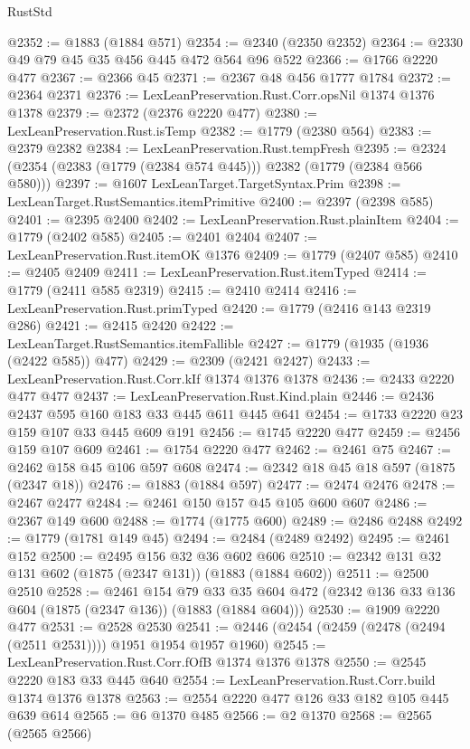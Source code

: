 \begin{lexlean}{RustStd}
\begin{coremodule}
@2352 := @1883 (@1884 @571)
@2354 := @2340 (@2350 @2352)
@2364 := @2330 @49 @79 @45 @35 @456 @445 @472 @564 @96 @522
@2366 := @1766 @2220 @477
@2367 := @2366 @45
@2371 := @2367 @48 @456 @1777 @1784
@2372 := @2364 @2371
@2376 := LexLeanPreservation.Rust.Corr.opsNil @1374 @1376 @1378
@2379 := @2372 (@2376 @2220 @477)
@2380 := LexLeanPreservation.Rust.isTemp
@2382 := @1779 (@2380 @564)
@2383 := @2379 @2382
@2384 := LexLeanPreservation.Rust.tempFresh
@2395 := @2324 (@2354 (@2383 (@1779 (@2384 @574 @445))) @2382 (@1779 (@2384 @566 @580)))
@2397 := @1607 LexLeanTarget.TargetSyntax.Prim
@2398 := LexLeanTarget.RustSemantics.itemPrimitive
@2400 := @2397 (@2398 @585)
@2401 := @2395 @2400
@2402 := LexLeanPreservation.Rust.plainItem
@2404 := @1779 (@2402 @585)
@2405 := @2401 @2404
@2407 := LexLeanPreservation.Rust.itemOK @1376
@2409 := @1779 (@2407 @585)
@2410 := @2405 @2409
@2411 := LexLeanPreservation.Rust.itemTyped
@2414 := @1779 (@2411 @585 @2319)
@2415 := @2410 @2414
@2416 := LexLeanPreservation.Rust.primTyped
@2420 := @1779 (@2416 @143 @2319 @286)
@2421 := @2415 @2420
@2422 := LexLeanTarget.RustSemantics.itemFallible
@2427 := @1779 (@1935 (@1936 (@2422 @585)) @477)
@2429 := @2309 (@2421 @2427)
@2433 := LexLeanPreservation.Rust.Corr.kIf @1374 @1376 @1378
@2436 := @2433 @2220 @477 @477
@2437 := LexLeanPreservation.Rust.Kind.plain
@2446 := @2436 @2437 @595 @160 @183 @33 @445 @611 @445 @641
@2454 := @1733 @2220 @23 @159 @107 @33 @445 @609 @191
@2456 := @1745 @2220 @477
@2459 := @2456 @159 @107 @609
@2461 := @1754 @2220 @477
@2462 := @2461 @75
@2467 := @2462 @158 @45 @106 @597 @608
@2474 := @2342 @18 @45 @18 @597 (@1875 (@2347 @18))
@2476 := @1883 (@1884 @597)
@2477 := @2474 @2476
@2478 := @2467 @2477
@2484 := @2461 @150 @157 @45 @105 @600 @607
@2486 := @2367 @149 @600
@2488 := @1774 (@1775 @600)
@2489 := @2486 @2488
@2492 := @1779 (@1781 @149 @45)
@2494 := @2484 (@2489 @2492)
@2495 := @2461 @152
@2500 := @2495 @156 @32 @36 @602 @606
@2510 := @2342 @131 @32 @131 @602 (@1875 (@2347 @131)) (@1883 (@1884 @602))
@2511 := @2500 @2510
@2528 := @2461
    @154
    @79
    @33
    @35
    @604
    @472
    (@2342 @136 @33 @136 @604 (@1875 (@2347 @136)) (@1883 (@1884 @604)))
@2530 := @1909 @2220 @477
@2531 := @2528 @2530
@2541 := @2446 (@2454 (@2459 (@2478 (@2494 (@2511 @2531)))) @1951 @1954 @1957 @1960)
@2545 := LexLeanPreservation.Rust.Corr.fOfB @1374 @1376 @1378
@2550 := @2545 @2220 @183 @33 @445 @640
@2554 := LexLeanPreservation.Rust.Corr.build @1374 @1376 @1378
@2563 := @2554 @2220 @477 @126 @33 @182 @105 @445 @639 @614
@2565 := @6 @1370 @485
@2566 := @2 @1370
@2568 := @2565 (@2565 @2566)

\end{coremodule}
\end{lexlean}

